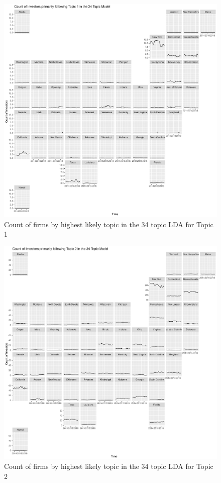	\begin{figure}
		\centering
		\includegraphics[width=1\linewidth]{Figures/ChapterV/USA_34_Topic01.pdf}
		\caption[Count of firm for Topic 1 by quarter]{Count of firms by highest likely topic in the 34 topic LDA for Topic 1}
		\label{fig:StateLDA1}
	\end{figure}
	
	\begin{figure}
		\centering
		\includegraphics[width=1\linewidth]{Figures/ChapterV/USA_34_Topic02.pdf}
		\caption[Count of firm for Topic 2 by quarter]{Count of firms by highest likely topic in the 34 topic LDA for Topic 2}
		\label{fig:StateLDA2}
	\end{figure}
	
